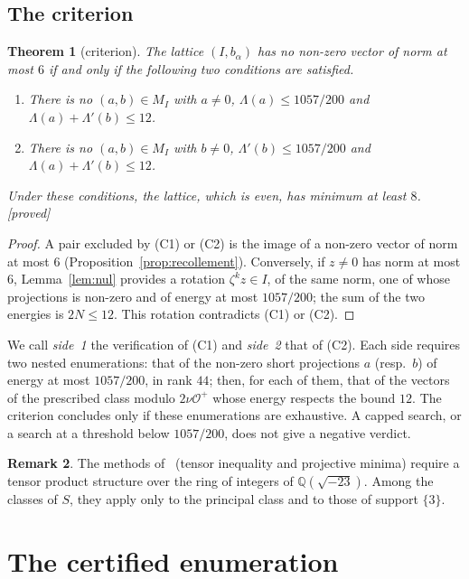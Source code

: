 \documentclass[11pt,a4paper]{amsart}
\theoremstyle{plain}
\newtheorem{theorem}{Theorem}[section]
\theoremstyle{definition}
\newtheorem{remark}[theorem]{Remark}
\numberwithin{equation}{section}
\newcommand{\Q}{\mathbb{Q}}
\newcommand{\Op}{\mathcal{O}^{+}}
\newcommand{\st}[1]{\textup{\textsf{\small[#1]}}}
\newcommand{\DEM}{\st{proved}}
\begin{document}
\subsection{The criterion}

\begin{theorem}[criterion]\label{thm:critere}
The lattice $(I,b_\alpha)$ has no non-zero vector of norm at most $6$ if and only if the following two conditions are satisfied.
\begin{enumerate}[label=\textup{(C\arabic*)}]
\item There is no $(a,b)\in M_I$ with $a\ne0$, $\Lambda(a)\le1057/200$ and $\Lambda(a)+\Lambda'(b)\le12$.
\item There is no $(a,b)\in M_I$ with $b\ne0$, $\Lambda'(b)\le1057/200$ and $\Lambda(a)+\Lambda'(b)\le12$.
\end{enumerate}
Under these conditions, the lattice, which is even, has minimum at least $8$. \DEM
\end{theorem}

\begin{proof}
A pair excluded by (C1) or (C2) is the image of a non-zero vector of norm at most $6$ (Proposition~\ref{prop:recollement}). Conversely, if $z\ne0$ has norm at most $6$, Lemma~\ref{lem:nul} provides a rotation $\zeta^kz\in I$, of the same norm, one of whose projections is non-zero and of energy at most $1057/200$; the sum of the two energies is $2N\le12$. This rotation contradicts (C1) or (C2).
\end{proof}

We call \emph{side~1} the verification of (C1) and \emph{side~2} that of (C2). Each side requires two nested enumerations: that of the non-zero short projections $a$ (resp.\ $b$) of energy at most $1057/200$, in rank $44$; then, for each of them, that of the vectors of the prescribed class modulo $2\nu\Op$ whose energy respects the bound $12$. The criterion concludes only if these enumerations are exhaustive. A capped search, or a search at a threshold below $1057/200$, does not give a negative verdict.

\begin{remark}
The methods of~\cite{Sak26} (tensor inequality and projective minima) require a tensor product structure over the ring of integers of $\Q(\sqrt{-23})$. Among the classes of $S$, they apply only to the principal class and to those of support $\{3\}$.
\end{remark}

\section{The certified enumeration}\label{sec:certifiant}
\end{document}
